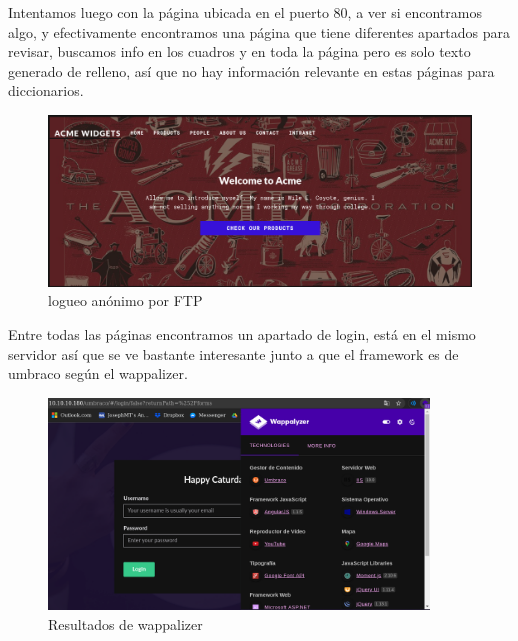 \documentclass{article}
\begin{document}
Intentamos luego con la página ubicada en el puerto 80, a ver si encontramos algo, y efectivamente encontramos una página que tiene diferentes apartados para revisar, buscamos info en los cuadros y en toda la página pero es solo texto generado de relleno, así que no hay información relevante en estas páginas para diccionarios.
\begin{figure}[h!]
	\center 
	\includegraphics[width=\textwidth]{images/remote/index_pagina.png}
	\caption{logueo anónimo por FTP}
\end{figure}

\clearpage

Entre todas las páginas encontramos un apartado de login, está en el mismo servidor así que se ve bastante interesante junto a que el framework es de umbraco según el wappalizer.
\begin{figure}[h!]
	\center 
	\includegraphics[width=0.9\textwidth]{images/remote/wappalizer.png}
	\caption{Resultados de wappalizer}
\end{figure}
\end{document}
